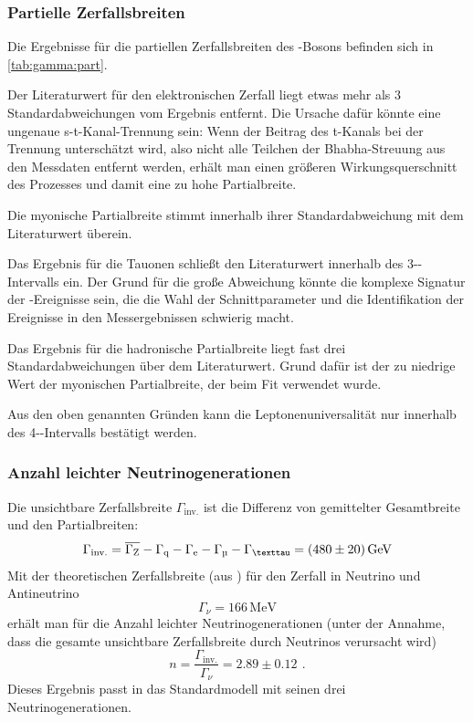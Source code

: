 \subsubsection{Partielle Zerfallsbreiten}
\label{subsub:partWidth}
Die Ergebnisse für die partiellen Zerfallsbreiten des \Z-Bosons befinden sich in \autoref{tab:gamma:part}.

Der Literaturwert für den elektronischen Zerfall liegt etwas mehr als 3 Standardabweichungen vom Ergebnis entfernt.
Die Ursache dafür könnte eine ungenaue s-t-Kanal-Trennung sein:
Wenn der Beitrag des t-Kanals bei der Trennung unterschätzt wird,
also nicht alle Teilchen der Bhabha-Streuung aus den Messdaten entfernt werden,
erhält man einen größeren Wirkungsquerschnitt des Prozesses und damit eine zu hohe Partialbreite.

Die myonische Partialbreite stimmt innerhalb ihrer Standardabweichung mit dem Literaturwert überein.

Das Ergebnis für die Tauonen schließt den Literaturwert innerhalb des 3-\textsigma-Intervalls ein.
Der Grund für die große Abweichung könnte die komplexe Signatur der \texttau-Ereignisse sein,
die die Wahl der Schnittparameter und die Identifikation der Ereignisse in den Messergebnissen schwierig macht.

Das Ergebnis für die hadronische Partialbreite liegt fast drei Standardabweichungen über dem Literaturwert.
Grund dafür ist der zu niedrige Wert der myonischen Partialbreite, der beim Fit verwendet wurde.

Aus den oben genannten Gründen kann die Leptonenuniversalität nur innerhalb des 4-\textsigma-Intervalls
bestätigt werden.



\subsubsection{Anzahl leichter Neutrinogenerationen}
Die unsichtbare Zerfallsbreite $\Gamma_\text{inv.}$ ist die
Differenz von gemittelter Gesamtbreite und den Partialbreiten:
\begin{equation}
  \Gamma_\text{inv.}=\overline{\Gamma_\text{Z}}-\Gamma_\text{q}-\Gamma_\text{e}-\Gamma_\text{\textmu}-\Gamma_\text{\texttau}
  =(480 \pm 20)\,\text{GeV}
\end{equation}
Mit der theoretischen Zerfallsbreite (aus \cite{manualmuc}) für den Zerfall in Neutrino und Antineutrino
\begin{equation}
  \Gamma_\nu=166\,\text{MeV}
\end{equation}
erhält man für die Anzahl leichter Neutrinogenerationen
(unter der Annahme, dass die gesamte unsichtbare Zerfallsbreite durch Neutrinos verursacht wird)
\begin{equation}
  n=\frac{\Gamma_\text{inv.}}{\Gamma_\nu}=2.89 \pm 0.12 \ \, .
\end{equation}
Dieses Ergebnis passt in das Standardmodell mit seinen drei Neutrinogenerationen.

